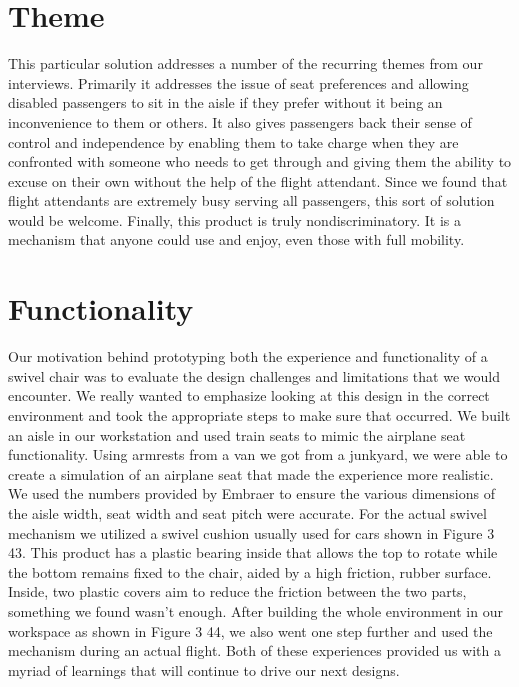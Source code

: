 \documentclass[a4paper, 12pt,conference]{new_cit_thesis}
\begin{document}
\section*{Theme}
This particular solution addresses a number of the recurring themes from our interviews. Primarily it addresses the issue of seat preferences and allowing disabled passengers to sit in the aisle if they prefer without it being an inconvenience to them or others. It also gives passengers back their sense of control and independence by enabling them to take charge when they are confronted with someone who needs to get through and giving them the ability to excuse on their own without the help of the flight attendant. Since we found that flight attendants are extremely busy serving all passengers, this sort of solution would be welcome. Finally, this product is truly nondiscriminatory. It is a mechanism that anyone could use and enjoy, even those with full mobility. 

\section*{Functionality}
Our motivation behind prototyping both the experience and functionality of a swivel chair was to evaluate the design challenges and limitations that we would encounter. We really wanted to emphasize looking at this design in the correct environment and took the appropriate steps to make sure that occurred. We built an aisle in our workstation and used train seats to mimic the airplane seat functionality. Using armrests from a van we got from a junkyard, we were able to create a simulation of an airplane seat that made the experience more realistic. We used the numbers provided by Embraer to ensure the various dimensions of the aisle width, seat width and seat pitch were accurate.  For the actual swivel mechanism we utilized a swivel cushion usually used for cars shown in Figure 3 43. This product has a plastic bearing inside that allows the top to rotate while the bottom remains fixed to the chair, aided by a high friction, rubber surface. Inside, two plastic covers aim to reduce the friction between the two parts, something we found wasn’t enough. After building the whole environment in our workspace as shown in Figure 3 44, we also went one step further and used the mechanism during an actual flight. Both of these experiences provided us with a myriad of learnings that will continue to drive our next designs. 
\end{document}
